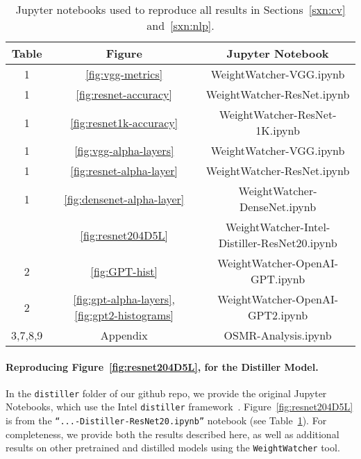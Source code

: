 \begin{table}[t]
\small
\begin{center}
\begin{tabular}{|c|c|c|}
\hline
Table & Figure & Jupyter Notebook \\
\hline
1 & \ref{fig:vgg-metrics}                                 & WeightWatcher-VGG.ipynb \\
1 & \ref{fig:resnet-accuracy}                             & WeightWatcher-ResNet.ipynb \\
1 & \ref{fig:resnet1k-accuracy}                           & WeightWatcher-ResNet-1K.ipynb \\
1 & \ref{fig:vgg-alpha-layers}                            & WeightWatcher-VGG.ipynb \\
1 & \ref{fig:resnet-alpha-layer}                          & WeightWatcher-ResNet.ipynb \\
1 & \ref{fig:densenet-alpha-layer}                        & WeightWatcher-DenseNet.ipynb \\
\hline
& \ref{fig:resnet204D5L}                                & WeightWatcher-Intel-Distiller-ResNet20.ipynb \\
\hline
2 & \ref{fig:GPT-hist}                                    & WeightWatcher-OpenAI-GPT.ipynb \\
2 & \ref{fig:gpt-alpha-layers}, \ref{fig:gpt2-histograms} & WeightWatcher-OpenAI-GPT2.ipynb \\
\hline
3,7,8,9 & Appendix & OSMR-Analysis.ipynb \\
\hline
\end{tabular}
\end{center}
\caption{Jupyter notebooks used to reproduce all results in Sections~\ref{sxn:cv} and~\ref{sxn:nlp}.}
\label{table:notebooks}
\end{table}


\paragraph{Reproducing Figure~\ref{fig:resnet204D5L}, for the Distiller Model.}

In the \texttt{distiller} folder of our github repo, 
we provide the original Jupyter Notebooks, which use the Intel \texttt{distiller} framework~\cite{distiller}.   %
Figure~\ref{fig:resnet204D5L} is from the  \texttt{``...-Distiller-ResNet20.ipynb''} notebook (see Table~\ref{table:notebooks}).  
For completeness, we provide both the results described here, as well as additional results on other pretrained and distilled models using the \texttt{WeightWatcher} tool.


